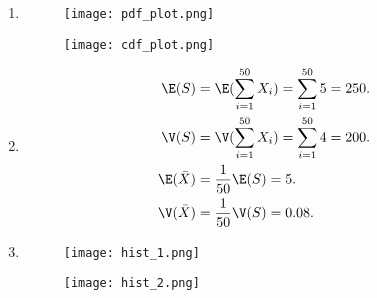 \begin{solution}

\phantom{}

\begin{enumerate}[label = (\alph*)]
  \item
  \begin{figure}[H]
      \centering
      \texttt{[image: pdf\_plot.png]}
      \caption{}
      \label{}
  \end{figure}
  \begin{figure}[H]
      \centering
      \texttt{[image: cdf\_plot.png]}
      \caption{}
      \label{}
  \end{figure}
  \item
  \begin{align*}
    \E(S) &= \E(\sum_{i=1}^{50} X_i) = \sum_{i=1}^{50}5 = 250. \\
    \V(S) &= \V(\sum_{i=1}^{50} X_i) = \sum_{i=1}^{50}4 = 200. \\
    \E(\bar{X}) &= \frac{1}{50}\E(S) = 5. \\
    \V(\bar{X}) &= \frac{1}{50}\V(S) = 0.08.
  \end{align*}
  \item
  \begin{figure}[H]
      \centering
      \texttt{[image: hist\_1.png]}
      \caption{}
      \label{}
  \end{figure}
  \begin{figure}[H]
      \centering
      \texttt{[image: hist\_2.png]}
      \caption{}
      \label{}
  \end{figure}
\end{enumerate}

\end{solution}

